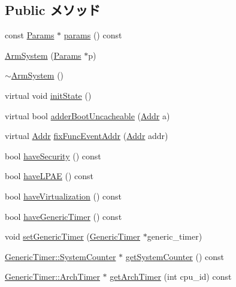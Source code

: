 \subsection*{Public メソッド}
\begin{DoxyCompactItemize}
\item 
const \hyperlink{classArmSystem_a8ae84e66b34bac08937a6bad4412ba5d}{Params} $\ast$ \hyperlink{classArmSystem_acd3c3feb78ae7a8f88fe0f110a718dff}{params} () const 
\item 
\hyperlink{classArmSystem_a770423e6e1a1f3470611eeebb5499e52}{ArmSystem} (\hyperlink{classArmSystem_a8ae84e66b34bac08937a6bad4412ba5d}{Params} $\ast$p)
\item 
\hyperlink{classArmSystem_a644c41d726bc3006918069971ed37c89}{$\sim$ArmSystem} ()
\item 
virtual void \hyperlink{classArmSystem_a3c34ea9b29f410748d4435a667484924}{initState} ()
\item 
virtual bool \hyperlink{classArmSystem_aa3d376f8ebebf8bc40b44b3ef359cf3d}{adderBootUncacheable} (\hyperlink{base_2types_8hh_af1bb03d6a4ee096394a6749f0a169232}{Addr} a)
\item 
virtual \hyperlink{base_2types_8hh_af1bb03d6a4ee096394a6749f0a169232}{Addr} \hyperlink{classArmSystem_aff94f650c5eef23b8dc350ea755bdef4}{fixFuncEventAddr} (\hyperlink{base_2types_8hh_af1bb03d6a4ee096394a6749f0a169232}{Addr} addr)
\item 
bool \hyperlink{classArmSystem_ae08900555a461016d6648524cba6e74c}{haveSecurity} () const 
\item 
bool \hyperlink{classArmSystem_a39b5e5d6cff3c8f5a248143a702d8f1a}{haveLPAE} () const 
\item 
bool \hyperlink{classArmSystem_afef641e959fe33dee8702b9bb5e1b9e4}{haveVirtualization} () const 
\item 
bool \hyperlink{classArmSystem_aecff777f050f73e02052a0a3691e0303}{haveGenericTimer} () const 
\item 
void \hyperlink{classArmSystem_a8d0ae73d8ff6797f8b38801bffd82454}{setGenericTimer} (\hyperlink{classGenericTimer}{GenericTimer} $\ast$generic\_\-timer)
\item 
\hyperlink{classGenericTimer_1_1SystemCounter}{GenericTimer::SystemCounter} $\ast$ \hyperlink{classArmSystem_af76ffe466ccc286510b4747521fabcfe}{getSystemCounter} () const 
\item 
\hyperlink{classGenericTimer_1_1ArchTimer}{GenericTimer::ArchTimer} $\ast$ \hyperlink{classArmSystem_af8bdff642693841d42bfdb92c78729a3}{getArchTimer} (int cpu\_\-id) const 

\end{DoxyCompactItemize}
